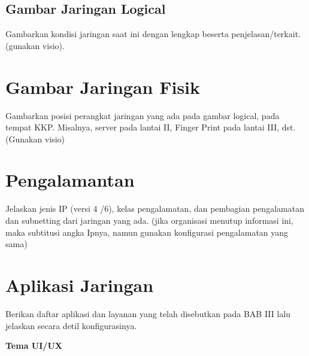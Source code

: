\subsection{Gambar Jaringan Logical}
\begin{subsectioncontent}
    \hspace{\parindent}Gambarkan kondisi jaringan saat ini dengan lengkap beserta penjelasan/terkait. (gunakan visio).
\end{subsectioncontent}

\section{Gambar Jaringan Fisik}
\begin{sectioncontent}
    \hspace{\parindent}Gambarkan posisi perangkat jaringan yang ada pada gambar logical, pada tempat KKP. Misalnya, server pada lantai II, Finger Print pada lantai III, dst. (Gunakan visio)
\end{sectioncontent}

\section{Pengalamantan}
\begin{sectioncontent}
    \hspace{\parindent}Jelaskan jenis IP (versi 4 /6), kelas pengalamatan, dan pembagian pengalamatan dan subnetting dari jaringan yang ada. (jika organisasi menutup informasi ini, maka subtitusi angka Ipnya, namun gunakan konfigurasi pengalamatan yang sama)
\end{sectioncontent}

\section{Aplikasi Jaringan}
\begin{sectioncontent}
    \hspace{\parindent}Berikan daftar aplikasi dan layanan yang telah disebutkan pada BAB III lalu jelaskan secara detil konfigurasinya.
\end{sectioncontent}

\textbf{Tema UI/UX}

\setcounter{section}{0} %
\setcounter{subsection}{0} %

